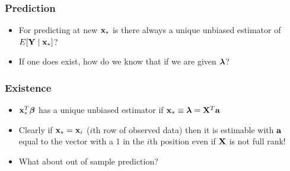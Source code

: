 \documentclass{beamer}\usepackage[]{graphicx}\usepackage[]{color}
\begin{document}
\begin{frame} \frametitle{Prediction}
  \begin{itemize}
  \item   For predicting at new $\mathbf{x}_*$ is there always a unique unbiased
  estimator of $E[\mathbf{Y} \mid \mathbf{x}_*]$? \pause
\item If one does exist, how do we know that if we are given $\boldsymbol{\lambda}$?

  \end{itemize}

\end{frame}
\begin{frame} \frametitle{Existence}
  \begin{itemize}
  \item  $\mathbf{x}_*^T \boldsymbol{\beta}$ has a unique unbiased estimator if $\mathbf{x}_* \equiv
    \boldsymbol{\lambda} = \mathbf{X}^T \mathbf{a}$ \pause
\item Clearly if $\mathbf{x}_* = \mathbf{x}_i$ ($i$th row of observed data) then it is
  estimable with $\mathbf{a}$ equal to the vector with a 1 in the $i$th position
  even if $\mathbf{X}$ is not full rank! \pause
\item What about out of sample prediction? \pause
\end{itemize}

\end{frame}
\end{document}
